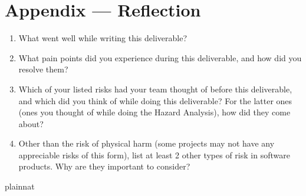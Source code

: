 \documentclass{article}
\begin{document}
\newpage{}

\section*{Appendix --- Reflection}




\begin{enumerate}
    \item What went well while writing this deliverable? 
    \item What pain points did you experience during this deliverable, and how
    did you resolve them?
    \item Which of your listed risks had your team thought of before this
    deliverable, and which did you think of while doing this deliverable? For
    the latter ones (ones you thought of while doing the Hazard Analysis), how
    did they come about?
    \item Other than the risk of physical harm (some projects may not have any
    appreciable risks of this form), list at least 2 other types of risk in
    software products. Why are they important to consider?
\end{enumerate}

 {plainnat}

\end{document}
